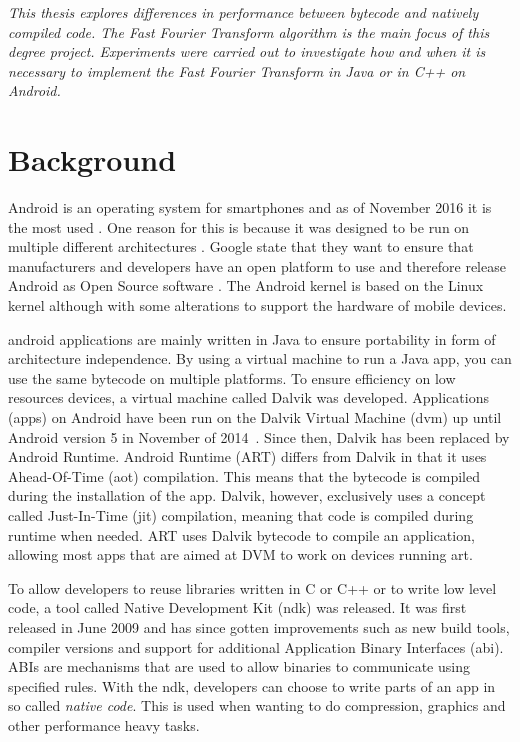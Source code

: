 \textit{This thesis explores differences in performance between bytecode and natively compiled code. The Fast Fourier Transform algorithm is the main focus of this degree project. Experiments were carried out to investigate how and when it is necessary to implement the Fast Fourier Transform in Java or in C++ on Android.}

\section{Background}
Android is an operating system for smartphones and as of November 2016 it is the most used \cite{android:os:popularity}. One reason for this is because it was designed to be run on multiple different architectures \cite{android:os:devices}. Google state that they want to ensure that manufacturers and developers have an open platform to use and therefore release Android as Open Source software \cite{android:os:opensource}. The Android kernel is based on the Linux kernel although with some alterations to support the hardware of mobile devices.

\gls{android} applications are mainly written in Java to ensure portability in form of architecture independence. By using a virtual machine to run a Java app, you can use the same bytecode on multiple platforms. To ensure efficiency on low resources devices, a virtual machine called Dalvik was developed. Applications (apps) on Android have been run on the Dalvik Virtual Machine (\gls{dvm}) up until Android version 5 in November of 2014~\cite{android:dalvik,android:dalvik:release}. Since then, Dalvik has been replaced by Android Runtime. Android Runtime (ART) differs from Dalvik in that it uses Ahead-Of-Time (\gls{aot}) compilation. This means that the bytecode is compiled during the installation of the app. Dalvik, however, exclusively uses a concept called Just-In-Time (\gls{jit}) compilation, meaning that code is compiled during runtime when needed. ART uses Dalvik bytecode to compile an application, allowing most apps that are aimed at DVM to work on devices running \gls{art}.

To allow developers to reuse libraries written in C or C++ or to write low level code, a tool called Native Development Kit (\gls{ndk}) was released. It was first released in June 2009 \cite{Lin2011} and has since gotten improvements such as new build tools, compiler versions and support for additional Application Binary Interfaces (\gls{abi}). ABIs are mechanisms that are used to allow binaries to communicate using specified rules. With the \gls{ndk}, developers can choose to write parts of an app in so called \emph{native code}. This is used when wanting to do compression, graphics and other performance heavy tasks.


